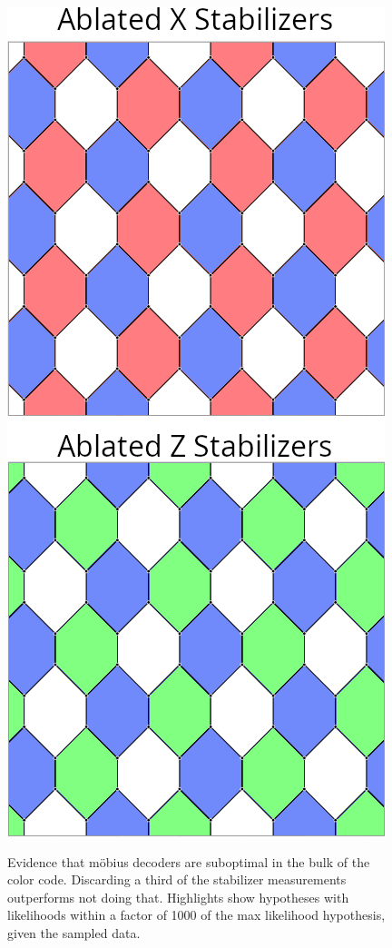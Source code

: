 \documentclass[onecolumn,unpublished,a4paper]{quantumarticle}
\theoremstyle{definition}
\theoremstyle{definition}
\theoremstyle{definition}
\begin{document}
\begin{figure}
{        \includegraphics{assets/ablated_stabilizers.png}
    }
    \caption{
        Evidence that m{\"o}bius decoders are suboptimal in the bulk of the color code.
        Discarding a third of the stabilizer measurements outperforms not doing that.
        Highlights show hypotheses with likelihoods within a factor of 1000 of the max likelihood hypothesis, given the sampled data.
    }
    \label{fig:hope}
\end{figure}
\end{document}
